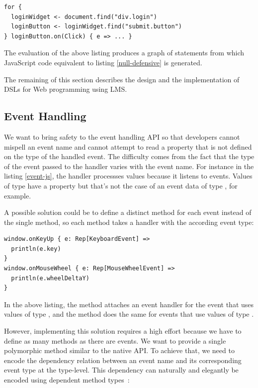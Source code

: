 \documentclass[american,english,runningheads]{llncs}
\begin{document}
\begin{lstlisting}
for {
  loginWidget <- document.find("div.login")
  loginButton <- loginWidget.find("submit.button")
} loginButton.on(Click) { e => ... }
\end{lstlisting}

The evaluation of the above listing produces a graph of statements from which JavaScript code equivalent to
listing \ref{null-defensive} is generated.

The remaining of this section describes the design and the implementation of DSLs for Web programming using LMS.

\subsection{Event Handling}

We want to bring safety to the event handling API so that developers cannot mispell an event name and cannot attempt
to read a property that is not defined on the type of the handled event. The difficulty comes from the fact that the
type of the event passed to the handler varies with the event name. For instance in the listing \ref{event-js}, the
handler processses  values because it listens to  events. Values of type
 have a property  but that’s not the case of an event data of type
, for example.

A possible solution could be to define a distinct method for each event instead of the single 
method, so each method takes a handler with the according event type:

\begin{lstlisting}
window.onKeyUp { e: Rep[KeyboardEvent] =>
  println(e.key)
}
window.onMouseWheel { e: Rep[MouseWheelEvent] =>
  println(e.wheelDeltaY)
}
\end{lstlisting}

In the above listing, the  method attaches an event handler for the  event that uses values
of type , and the  method does the same for  events that use
values of type .

However, implementing this solution requires a high effort because we have to define as many methods as there are
events. We want to provide a single polymorphic method similar to the native API. To achieve that, we need to encode
the dependency relation between an event name and its corresponding event type at the type-level. This dependency can
naturally and elegantly be encoded using dependent method types~\cite{Oliveira10_Typeclasses}:
\end{document}
